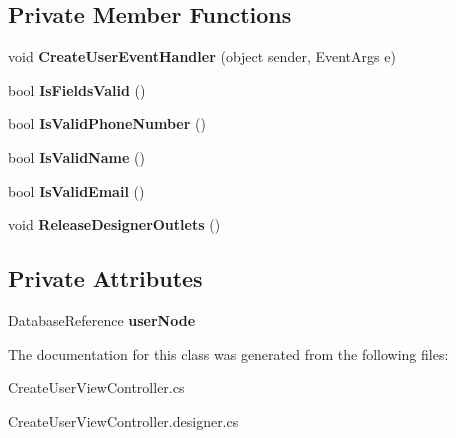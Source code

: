 \subsection*{Private Member Functions}
\begin{DoxyCompactItemize}
\item 
\mbox{\label{class_ramboell_1_1i_o_s_1_1_create_user_view_controller_aead6b702a9f1f9e55ece583ff3483b9b}} 
void {\bfseries Create\+User\+Event\+Handler} (object sender, Event\+Args e)
\item 
\mbox{\label{class_ramboell_1_1i_o_s_1_1_create_user_view_controller_a9fb584a81661ab13e7ebbbc4b22fa43e}} 
bool {\bfseries Is\+Fields\+Valid} ()
\item 
\mbox{\label{class_ramboell_1_1i_o_s_1_1_create_user_view_controller_a8449a20d5ee09c0166090ac86f299d9f}} 
bool {\bfseries Is\+Valid\+Phone\+Number} ()
\item 
\mbox{\label{class_ramboell_1_1i_o_s_1_1_create_user_view_controller_a77d72614f0c444b0f60620196f8306d8}} 
bool {\bfseries Is\+Valid\+Name} ()
\item 
\mbox{\label{class_ramboell_1_1i_o_s_1_1_create_user_view_controller_af1e5e0486e38b9969b31174bb1cb85d6}} 
bool {\bfseries Is\+Valid\+Email} ()
\item 
\mbox{\label{class_ramboell_1_1i_o_s_1_1_create_user_view_controller_a032e8df0f82d8ed39b11cbf867b96249}} 
void {\bfseries Release\+Designer\+Outlets} ()
\end{DoxyCompactItemize}
\subsection*{Private Attributes}
\begin{DoxyCompactItemize}
\item 
\mbox{\label{class_ramboell_1_1i_o_s_1_1_create_user_view_controller_abe5c9ab167172a8eb0fcd84b0beff825}} 
Database\+Reference {\bfseries user\+Node}
\end{DoxyCompactItemize}


The documentation for this class was generated from the following files\+:\begin{DoxyCompactItemize}
\item 
Create\+User\+View\+Controller.\+cs\item 
Create\+User\+View\+Controller.\+designer.\+cs\end{DoxyCompactItemize}
